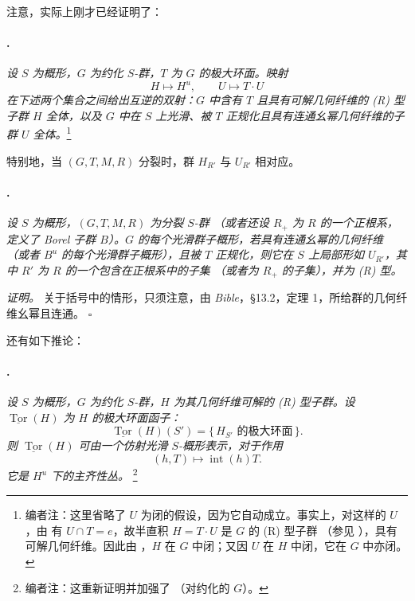 注意，实际上刚才已经证明了：

\paragraph{.}
\textit{设 \(S\) 为概形，\(G\) 为约化 \(S\)-群，\(T\) 为 \(G\) 的极大环面。映射}
\[
  H\longmapsto H^u,
  \qquad
  U\longmapsto T\cdot U
\]
\textit{在下述两个集合之间给出互逆的双射：\(G\) 中含有 \(T\) 且具有可解几何纤维的 \textup{(R)} 型子群 \(H\) 全体，以及 \(G\) 中在 \(S\) 上光滑、被 \(T\) 正规化且具有连通幺幂几何纤维的子群 \(U\) 全体。}\footnote{编者注：这里省略了 \(U\) 为闭的假设，因为它自动成立。事实上，对这样的 \(U\)，由  有 \(U\cap T=e\)，故半直积 \(H=T\cdot U\) 是 \(G\) 的 \textup{(R)} 型子群 \textup{（参见 ）}，具有可解几何纤维。因此由 ，\(H\) 在 \(G\) 中闭；又因 \(U\) 在 \(H\) 中闭，它在 \(G\) 中亦闭。}

特别地，当 \((G,T,M,R)\) 分裂时，群 \(H_{R'}\) 与 \(U_{R'}\) 相对应。

\paragraph{.}
\textit{设 \(S\) 为概形，\((G,T,M,R)\) 为分裂 \(S\)-群 \textup{（或者还设 \(R_+\) 为 \(R\) 的一个正根系，定义了 Borel 子群 \(B\)）}。\(G\) 的每个光滑群子概形，若具有连通幺幂的几何纤维 \textup{（或者 \(B^u\) 的每个光滑群子概形）}，且被 \(T\) 正规化，则它在 \(S\) 上局部形如 \(U_{R'}\)，其中 \(R'\) 为 \(R\) 的一个包含在正根系中的子集 \textup{（或者为 \(R_+\) 的子集）}，并为 \textup{(R)} 型。}

\textit{证明。}
关于括号中的情形，只须注意，由 \emph{Bible}，\S13.2，定理 1\textup{}，所给群的几何纤维幺幂且连通。
\hfill\(\square\)

 还有如下推论：

\paragraph{.}
\textit{设 \(S\) 为概形，\(G\) 为约化 \(S\)-群，\(H\) 为其几何纤维可解的 \textup{(R)} 型子群。设 \(\underline{\operatorname{Tor}}(H)\) 为 \(H\) 的极大环面函子：}
\[
  \underline{\operatorname{Tor}}(H)(S')
  =
  \{\,H_{S'}\text{ 的极大环面}\,\}.
\]
\textit{则 \(\underline{\operatorname{Tor}}(H)\) 可由一个仿射光滑 \(S\)-概形表示，对于作用}
\[
  (h,T)\longmapsto\operatorname{int}(h)T.
\]
\textit{它是 \(H^u\) 下的主齐性丛。}
\footnote{编者注：这重新证明并加强了  \textup{（对约化的 \(G\)）}。}


